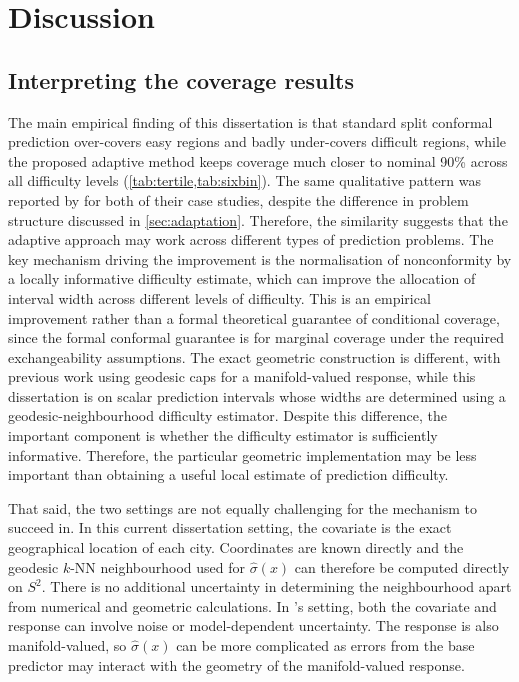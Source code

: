 \documentclass[11pt,a4paper]{report}
\begin{document}
\chapter{Discussion}
\label{ch:discussion}

\section{Interpreting the coverage results}

The main empirical finding of this dissertation is that standard split conformal prediction over-covers easy regions and badly under-covers difficult regions, while the proposed adaptive method keeps coverage much closer to nominal 90\% across all difficulty levels (\cref{tab:tertile,tab:sixbin}). The same qualitative pattern was reported by \citet{amirishahbazi2026} for both of their case studies, despite the difference in problem structure discussed in \cref{sec:adaptation}. Therefore, the similarity suggests that the adaptive approach may work across different types of prediction problems. The key mechanism driving the improvement is the normalisation of nonconformity by a locally informative difficulty estimate, which can improve the allocation of interval width across different levels of difficulty. This is an empirical improvement rather than a formal theoretical guarantee of conditional coverage, since the formal conformal guarantee is for marginal coverage under the required exchangeability assumptions. The exact geometric construction is different, with previous work using geodesic caps for a manifold-valued response, while this dissertation is on scalar prediction intervals whose widths are determined using a geodesic-neighbourhood difficulty estimator. Despite this difference, the important component is whether the difficulty estimator is sufficiently informative. Therefore, the particular geometric implementation may be less important than obtaining a useful local estimate of prediction difficulty.
 
That said, the two settings are not equally challenging for the mechanism to succeed in. In this current dissertation setting, the covariate is the exact geographical location of each city. Coordinates are known directly and the geodesic $k$-NN neighbourhood used for $\hat\sigma(x)$ can therefore be computed directly on $S^2$. There is no additional uncertainty in determining the neighbourhood apart from numerical and geometric calculations. In \citeauthor{amirishahbazi2026}'s setting, both the covariate and response can involve noise or model-dependent uncertainty. The response is also manifold-valued, so $\hat\sigma(x)$ can be more complicated as errors from the base predictor may interact with the geometry of the manifold-valued response. 
\end{document}
